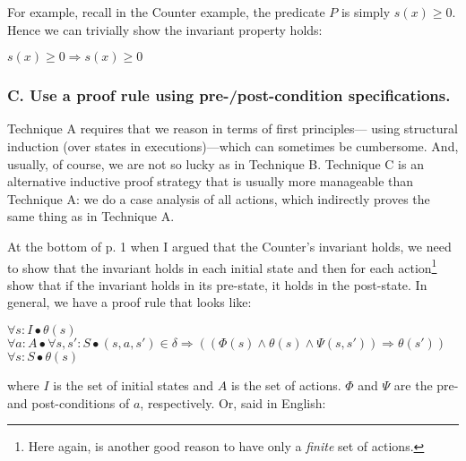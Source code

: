 For example, recall in the Counter example, the predicate $P$ is simply
$ s(x) \geq 0 $.  Hence we can trivially show the invariant property
holds:

\begin{center}
$ s(x) \geq 0 \Rightarrow s(x) \geq 0 $
\end{center}

\subsubsection*{C. Use a proof rule using pre-/post-condition specifications.}

Technique A requires that we reason in terms of first principles---
using structural induction
(over states in executions)---which can sometimes be cumbersome.
And, usually, of course, we are not so lucky as in Technique B.
Technique C is
an alternative inductive proof strategy
that is usually more manageable than Technique A:
we do a case analysis of all
actions, which indirectly proves the same thing as in Technique A.

At the bottom of p. 1
when I argued that the Counter's invariant holds,
we need to show that the invariant holds in each initial state
and then for each action\footnote{Here again, is another good reason
to have only a {\em finite} set of actions.} show that if the
invariant holds in its pre-state, it holds in the post-state.
In general, we have a proof rule that looks like:
\newpage
\begin{center}

$\forall s: I \bullet \theta(s)$\\
\underline{$\forall a: A \bullet \forall s, s': S \bullet (s, a, s') \in \delta \Rightarrow ( (\Phi(s) \wedge \theta(s) \wedge \Psi(s, s')) \Rightarrow \theta(s')) $}\\
$\forall s: S \bullet \theta(s)$

\end{center}

\noindent where $I$ is the set of initial states and $A$ is the set of
actions.
$\Phi$ and $\Psi$ are the pre- and post-conditions of $a$, respectively.
Or, said in English:

